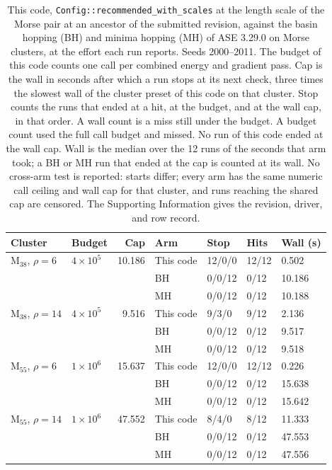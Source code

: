 \documentclass[journal=jctcce,manuscript=article]{achemso}
\begin{document}
\begin{table}
\caption{This code, \texttt{Config::recommended\_with\_scales} at the length scale
of the Morse pair at an ancestor of the submitted revision, against the basin hopping
(BH) and minima hopping (MH) of ASE 3.29.0 on Morse clusters, at the effort each run reports.
Seeds 2000--2011.
The budget of this code counts one call per combined energy and gradient pass.
Cap is the wall in seconds after which a run stops at its next check, three times
the slowest wall of the cluster preset of this code on that cluster.
Stop counts the runs that ended at a hit, at the budget, and at the wall cap, in that order.
A wall count is a miss still under the budget. A budget count used the full call budget and missed.
No run of this code ended at the wall cap.
Wall is the median over the 12 runs of the seconds that arm took;
a BH or MH run that ended at the cap is counted at its wall.
No cross-arm test is reported: starts differ; every arm has the same numeric call
ceiling and wall cap for that cluster, and runs reaching the shared cap are censored.
The Supporting Information gives the revision, driver, and row record.}
\label{tab:ase-morse}
\centering
\scriptsize
\setlength{\tabcolsep}{3pt}
\setlength{\arraystretch}{0.92}
\begin{tabular}{@{}llrllll@{}}
\toprule
Cluster & Budget & Cap & Arm & Stop & Hits & Wall (s) \\
\midrule
M\(_{38}\), \(\rho=6\) & \(4\times 10^{5}\) & 10.186 & This code & 12/0/0 & 12/12 & 0.502 \\
 &  &  & BH & 0/0/12 & 0/12 & 10.186 \\
 &  &  & MH & 0/0/12 & 0/12 & 10.188 \\
M\(_{38}\), \(\rho=14\) & \(4\times 10^{5}\) & 9.516 & This code & 9/3/0 & 9/12 & 2.136 \\
 &  &  & BH & 0/0/12 & 0/12 & 9.517 \\
 &  &  & MH & 0/0/12 & 0/12 & 9.518 \\
M\(_{55}\), \(\rho=6\) & \(1\times 10^{6}\) & 15.637 & This code & 12/0/0 & 12/12 & 0.226 \\
 &  &  & BH & 0/0/12 & 0/12 & 15.638 \\
 &  &  & MH & 0/0/12 & 0/12 & 15.642 \\
M\(_{55}\), \(\rho=14\) & \(1\times 10^{6}\) & 47.552 & This code & 8/4/0 & 8/12 & 11.333 \\
 &  &  & BH & 0/0/12 & 0/12 & 47.553 \\
 &  &  & MH & 0/0/12 & 0/12 & 47.556 \\
\bottomrule
\end{tabular}
\end{table}
\end{document}
